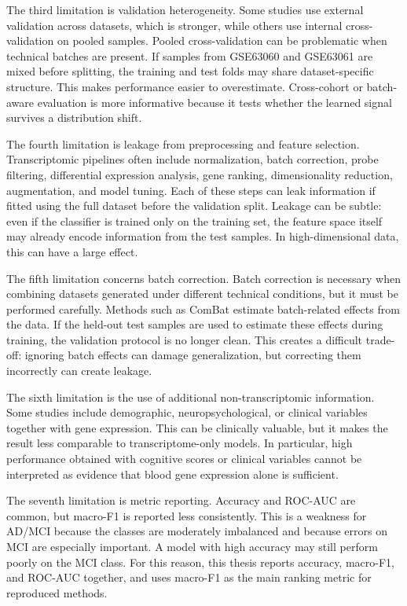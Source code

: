 The third limitation is validation heterogeneity. Some studies use external validation across datasets, which is stronger, while others use internal cross-validation on pooled samples. Pooled cross-validation can be problematic when technical batches are present. If samples from GSE63060 and GSE63061 are mixed before splitting, the training and test folds may share dataset-specific structure. This makes performance easier to overestimate. Cross-cohort or batch-aware evaluation is more informative because it tests whether the learned signal survives a distribution shift.

The fourth limitation is leakage from preprocessing and feature selection. Transcriptomic pipelines often include normalization, batch correction, probe filtering, differential expression analysis, gene ranking, dimensionality reduction, augmentation, and model tuning. Each of these steps can leak information if fitted using the full dataset before the validation split. Leakage can be subtle: even if the classifier is trained only on the training set, the feature space itself may already encode information from the test samples. In high-dimensional data, this can have a large effect.

The fifth limitation concerns batch correction. Batch correction is necessary when combining datasets generated under different technical conditions, but it must be performed carefully. Methods such as ComBat \cite{johnson2007combat} estimate batch-related effects from the data. If the held-out test samples are used to estimate these effects during training, the validation protocol is no longer clean. This creates a difficult trade-off: ignoring batch effects can damage generalization, but correcting them incorrectly can create leakage.

The sixth limitation is the use of additional non-transcriptomic information. Some studies include demographic, neuropsychological, or clinical variables together with gene expression. This can be clinically valuable, but it makes the result less comparable to transcriptome-only models. In particular, high performance obtained with cognitive scores or clinical variables cannot be interpreted as evidence that blood gene expression alone is sufficient.

The seventh limitation is metric reporting. Accuracy and ROC-AUC are common, but macro-F1 is reported less consistently. This is a weakness for AD/MCI because the classes are moderately imbalanced and because errors on MCI are especially important. A model with high accuracy may still perform poorly on the MCI class. For this reason, this thesis reports accuracy, macro-F1, and ROC-AUC together, and uses macro-F1 as the main ranking metric for reproduced methods.

